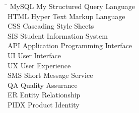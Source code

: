 \documentclass[a4paper,14pt]{article}
\begin{document}
		\newpage
		\noindent \normalsize
		\begin{tabbing}
			\hspace{1.5cm} \= \kill
			MySQL \> My Structured Query Language \\
			HTML  \> Hyper Text Markup Language \\
			CSS   \> Cascading Style Sheets \\
			SIS  \> Student Information System\\
			API \> Application Programming Interface\\
			UI \> User Interface\\
			UX \> User Experience\\
			SMS \> Short Message Service\\
			QA \> Quality Assurance\\
			ER \> Entity Relationship\\
			PIDX \> Product Identity\\
			
			
		\end{tabbing}
		
		\newpage
		
\end{document}
